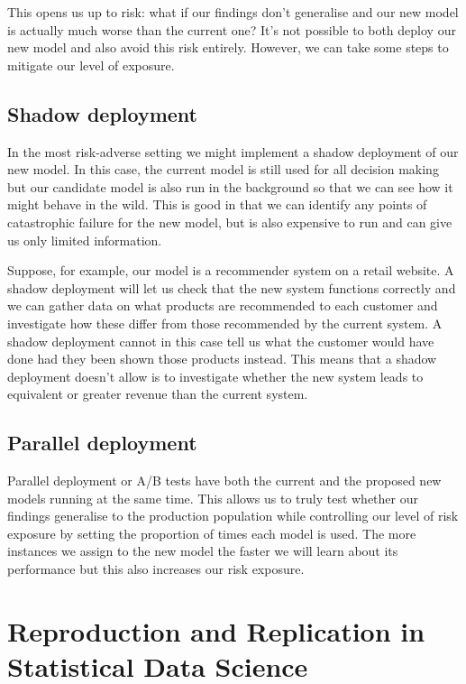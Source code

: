 \documentclass[
  12pt,
]{book}
\begin{document}
This opens us up to risk: what if our findings don't generalise and our new model is actually much worse than the current one? It's not possible to both deploy our new model and also avoid this risk entirely. However, we can take some steps to mitigate our level of exposure.

\hypertarget{shadow-deployment}{%
\subsection{Shadow deployment}\label{shadow-deployment}}

In the most risk-adverse setting we might implement a shadow deployment of our new model. In this case, the current model is still used for all decision making but our candidate model is also run in the background so that we can see how it might behave in the wild.
This is good in that we can identify any points of catastrophic failure for the new model, but is also expensive to run and can give us only limited information.

Suppose, for example, our model is a recommender system on a retail website. A shadow deployment will let us check that the new system functions correctly and we can gather data on what products are recommended to each customer and investigate how these differ from those recommended by the current system. A shadow deployment cannot in this case tell us what the customer would have done had they been shown those products instead. This means that a shadow deployment doesn't allow is to investigate whether the new system leads to equivalent or greater revenue than the current system.

\hypertarget{parallel-deployment}{%
\subsection{Parallel deployment}\label{parallel-deployment}}

Parallel deployment or A/B tests have both the current and the proposed new models running at the same time. This allows us to truly test whether our findings generalise to the production population while controlling our level of risk exposure by setting the proportion of times each model is used. The more instances we assign to the new model the faster we will learn about its performance but this also increases our risk exposure.

\hypertarget{reproduction-and-replication-in-statistical-data-science}{%
\section{Reproduction and Replication in Statistical Data Science}\label{reproduction-and-replication-in-statistical-data-science}}
\end{document}
